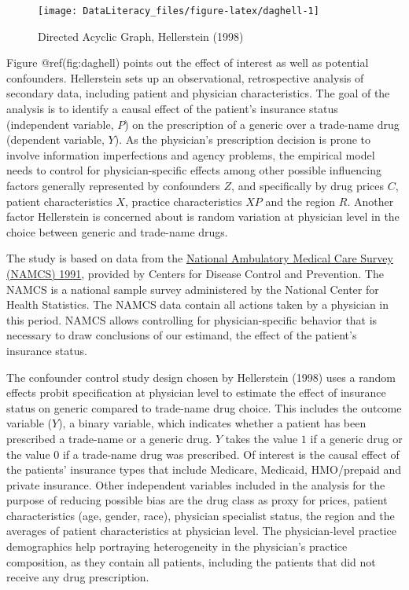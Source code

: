 \documentclass[
]{book}
\begin{document}
\begin{figure}

{\centering \texttt{[image: DataLiteracy\_files/figure-latex/daghell-1]} 

}

\caption{Directed Acyclic Graph, Hellerstein (1998)}\label{fig:daghell}
\end{figure}

Figure @ref(fig:daghell) points out the effect of interest as well as
potential confounders. Hellerstein sets up an observational,
retrospective analysis of secondary data, including patient and
physician characteristics. The goal of the analysis is to identify a
causal effect of the patient's insurance status (independent variable,
\(P\)) on the prescription of a generic over a trade-name drug
(dependent variable, \(Y\)). As the physician's prescription decision is
prone to involve information imperfections and agency problems, the
empirical model needs to control for physician-specific effects among
other possible influencing factors generally represented by confounders
\(Z\), and specifically by drug prices \(C\), patient characteristics
\(X\), practice characteristics \(XP\) and the region \(R\). Another
factor Hellerstein is concerned about is random variation at physician
level in the choice between generic and trade-name drugs.

The study is based on data from the
\href{https://ftp.cdc.gov/pub/Health_Statistics/NCHS/namcs_public_use_files/}{National
Ambulatory Medical Care Survey (NAMCS) 1991}, provided by Centers for
Disease Control and Prevention. The NAMCS is a national sample survey
administered by the National Center for Health Statistics. The NAMCS
data contain all actions taken by a physician in this period. NAMCS
allows controlling for physician-specific behavior that is necessary to
draw conclusions of our estimand, the effect of the patient's insurance
status.

The confounder control study design chosen by Hellerstein (1998) uses a
random effects probit specification at physician level to estimate the
effect of insurance status on generic compared to trade-name drug
choice. This includes the outcome variable (\(Y\)), a binary variable,
which indicates whether a patient has been prescribed a trade-name or a
generic drug. \(Y\) takes the value \(1\) if a generic drug or the value
\(0\) if a trade-name drug was prescribed. Of interest is the causal
effect of the patients' insurance types that include Medicare, Medicaid,
HMO/prepaid and private insurance. Other independent variables included
in the analysis for the purpose of reducing possible bias are the drug
class as proxy for prices, patient characteristics (age, gender, race),
physician specialist status, the region and the averages of patient
characteristics at physician level. The physician-level practice
demographics help portraying heterogeneity in the physician's practice
composition, as they contain all patients, including the patients that
did not receive any drug prescription.
\end{document}
